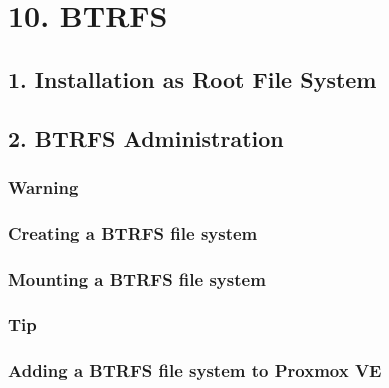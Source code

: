 \begin{table}[htbp]

\centering

\begin{tabular}

\end{tabular}

\end{table}

\begin{table}[htbp]

\centering

\begin{tabular}

\end{tabular}

\end{table}


\section{10. BTRFS}

\subsection{1. Installation as Root File System}

\subsection{2. BTRFS Administration}

\subsubsection{Warning}

\subsubsection{Creating a BTRFS file system}

\subsubsection{Mounting a BTRFS file system}

\subsubsection{Tip}

\subsubsection{Adding a BTRFS file system to Proxmox VE}

